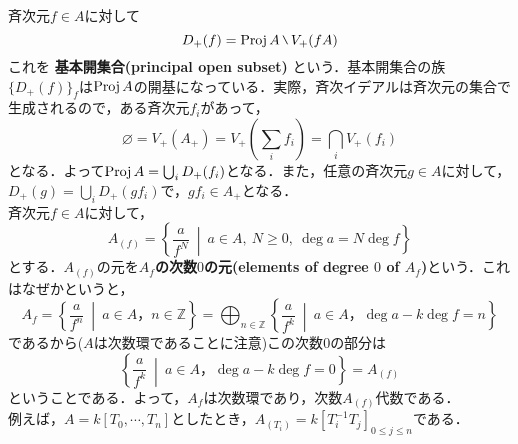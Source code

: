 斉次元$f\in A$に対して
\begin{equation*}
  D_{+}(f) = \proj{A}\mysetminus V_{+}(fA)
\end{equation*}
これを
\textbf{基本開集合(principal open subset)}
という．基本開集合の族$\{D_{+}(f)\}_{f}$は$\mathrm{Proj}\, A$の開基になっている．実際，斉次イデアルは斉次元の集合で生成されるので，ある斉次元$f_{i}$があって，
\begin{equation*}
  \varnothing = V_{+}(A_{+}) = V_{+}(\sum_{i}f_{i}) = \bigcap_{i}V_{+}(f_{i})
\end{equation*}
となる．よって$\mathrm{Proj}\, A = \bigcup_{i}D_{+}(f_{i})$となる．また，任意の斉次元$g\in A$に対して，$D_{+}(g) = \bigcup_{i}D_{+}(gf_{i})$で，$gf_{i} \in A_{+}$となる．\\
斉次元$f\in A$に対して，
\begin{equation*}
  A_{(f)} = \left\{ \frac{a}{f^{N}}\ \middle\vert \ a\in A,\ N\geq 0,\ \deg{a} = N\deg{f} \right\}
\end{equation*}
とする．$A_{(f)}$の元を\textbf{$A_{f}$の次数$0$の元(elements of degree $0$ of $A_{f}$)}という．これはなぜかというと，
\begin{equation*}
  A_{f} = \left\{\frac{a}{f^{n}}\ \middle\vert \ a\in A，n\in \mathbb{Z}\right\}
        = \bigoplus_{n \in \mathbb{Z}}\left\{ \frac{a}{f^{k}}\ \middle\vert \ a\in A，\deg{a} - k\deg{f} = n \right\}
\end{equation*}
であるから($A$は次数環であることに注意)この次数$0$の部分は
\begin{equation*}
  \left\{ \frac{a}{f^{k}} \ \middle\vert \ a\in A，\deg{a} - k\deg{f} = 0\right\} = A_{(f)}
\end{equation*}
ということである．よって，$A_{f}$は次数環であり，次数$A_{(f)}$代数である．\\
例えば，$A = k[T_{0},\cdots,T_{n}]$としたとき，$A_{(T_{i})} = k[T_{i}^{-1}T_{j}]_{0\leq j\leq n}$である．
